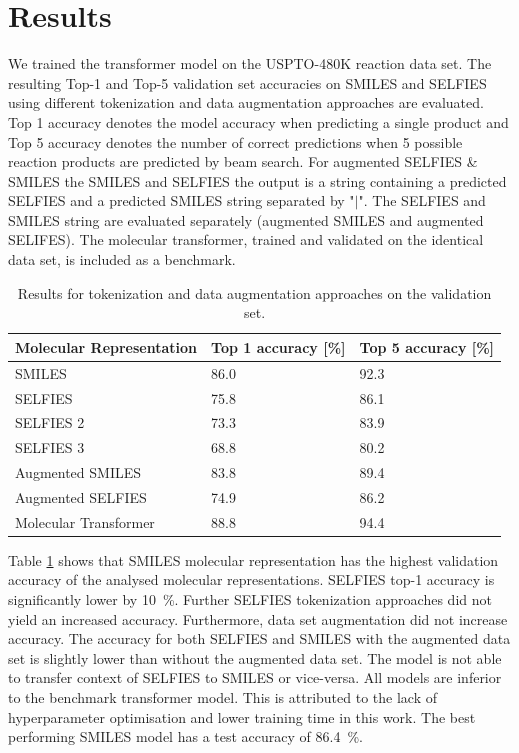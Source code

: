 \documentclass[10pt,conference,compsocconf]{IEEEtran}
\begin{document}
\section{Results}
We trained the transformer model on the USPTO-480K reaction data set. The resulting Top-1 and Top-5 validation set accuracies on SMILES and SELFIES using different tokenization and data augmentation approaches are evaluated. Top 1 accuracy denotes the model accuracy when predicting a single product and Top 5 accuracy denotes the number of correct predictions when 5 possible reaction products are predicted by beam search. For augmented SELFIES \& SMILES the SMILES and SELFIES the output is a string containing a predicted SELFIES and a predicted SMILES string separated by "$|$". The SELFIES and SMILES string are evaluated separately (augmented SMILES and augmented SELIFES). The molecular transformer\cite{MolecularTransformer}, trained and validated on the identical data set, is included as a benchmark. \\
\begin{table}[h!]
  \centering
  \begin{tabular}[c]{|l|l|l|}
    \hline
    Molecular Representation & Top 1 accuracy [\%] & Top 5 accuracy [\%] \\
    \hline
    SMILES & 86.0 & 92.3 \\
    SELFIES & 75.8 & 86.1 \\
    SELFIES 2 & 73.3 &  83.9 \\
    SELFIES 3 & 68.8 & 80.2 \\
    Augmented SMILES & 83.8 & 89.4 \\
    Augmented SELFIES & 74.9 & 86.2\\ \hline
    Molecular Transformer \cite{MolecularTransformer} &  88.8 & 94.4 \\
    \hline
  \end{tabular}
  \caption{Results for tokenization and data augmentation approaches on the validation set.}
  \label{tab:firstresults}
\end{table}

Table \ref{tab:firstresults} shows that SMILES molecular representation has the highest validation accuracy of the analysed molecular representations. SELFIES top-1 accuracy is significantly lower by 10~\%. Further SELFIES tokenization approaches did not yield an increased accuracy. Furthermore, data set augmentation did not increase accuracy. The accuracy for both SELFIES and SMILES with the augmented data set is slightly lower than without the augmented data set. The model is not able to transfer context of SELFIES to SMILES or vice-versa. All models are inferior to the benchmark transformer model. This is attributed to the lack of hyperparameter optimisation and lower training time in this work. The best performing SMILES model has a test accuracy of 86.4~\%.\\
\end{document}
